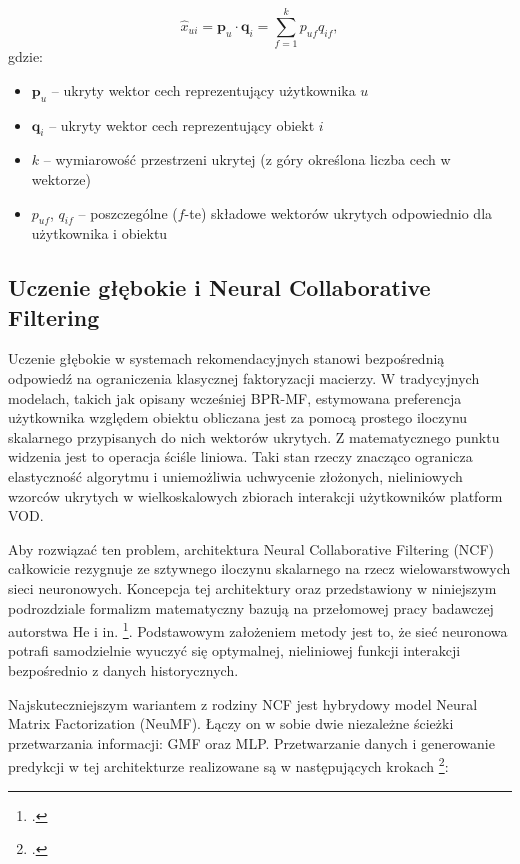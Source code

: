 \begin{equation}
    \hat{x}_{ui} = \mathbf{p}_u \cdot \mathbf{q}_i = \sum_{f=1}^{k} p_{uf} q_{if},
\end{equation}
gdzie:
\begin{itemize}
    \item $\mathbf{p}_u$ -- ukryty wektor cech reprezentujący użytkownika $u$
    \item $\mathbf{q}_i$ -- ukryty wektor cech reprezentujący obiekt $i$
    \item $k$ -- wymiarowość przestrzeni ukrytej (z góry określona liczba cech w wektorze)
    \item $p_{uf}$, $q_{if}$ -- poszczególne ($f$-te) składowe wektorów ukrytych odpowiednio dla użytkownika i obiektu
\end{itemize}

\subsection{Uczenie głębokie i Neural Collaborative Filtering}

Uczenie głębokie w systemach rekomendacyjnych stanowi bezpośrednią odpowiedź na ograniczenia klasycznej faktoryzacji macierzy. W tradycyjnych modelach, takich jak opisany wcześniej BPR-MF, estymowana preferencja użytkownika względem obiektu obliczana jest za pomocą prostego iloczynu skalarnego przypisanych do nich wektorów ukrytych. Z matematycznego punktu widzenia jest to operacja ściśle liniowa. Taki stan rzeczy znacząco ogranicza elastyczność algorytmu i uniemożliwia uchwycenie złożonych, nieliniowych wzorców ukrytych w wielkoskalowych zbiorach interakcji użytkowników platform VOD.

Aby rozwiązać ten problem, architektura Neural Collaborative Filtering (NCF) całkowicie rezygnuje ze sztywnego iloczynu skalarnego na rzecz wielowarstwowych sieci neuronowych. Koncepcja tej architektury oraz przedstawiony w niniejszym podrozdziale formalizm matematyczny bazują na przełomowej pracy badawczej autorstwa He i in. \footcite{heNeuralCollaborativeFilteringKwiecien032017}. Podstawowym założeniem metody jest to, że sieć neuronowa potrafi samodzielnie wyuczyć się optymalnej, nieliniowej funkcji interakcji bezpośrednio z danych historycznych.

Najskuteczniejszym wariantem z rodziny NCF jest hybrydowy model Neural Matrix Factorization (NeuMF). Łączy on w sobie dwie niezależne ścieżki przetwarzania informacji: GMF oraz MLP. Przetwarzanie danych i generowanie predykcji w tej architekturze realizowane są w następujących krokach \footcite{heNeuralCollaborativeFilteringKwiecien032017}:

